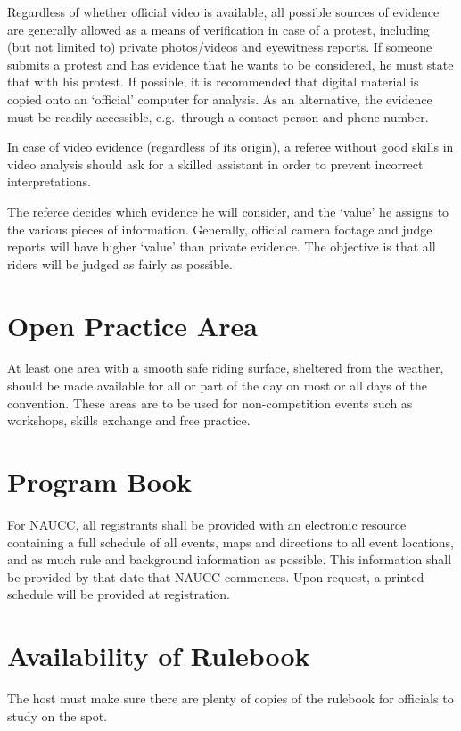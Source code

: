 Regardless of whether official video is available, all possible sources of evidence are generally allowed as a means of verification in case of a protest, including (but not limited to) private photos/videos and eyewitness reports.
If someone submits a protest and has evidence that he wants to be considered, he must state that with his protest.
If possible, it is recommended that digital material is copied onto an `official' computer for analysis.
As an alternative, the evidence must be readily accessible, e.g.\ through a contact person and phone number.

In case of video evidence (regardless of its origin), a referee without good skills in video analysis should ask for a skilled assistant in order to prevent incorrect interpretations.

The referee decides which evidence he will consider, and the `value' he assigns to the various pieces of information.
Generally, official camera footage and judge reports will have higher `value' than private evidence.
The objective is that all riders will be judged as fairly as possible.

\section{Open Practice Area}
At least one area with a smooth safe riding surface, sheltered from the weather, should be made available for all or part of the day on most or all days of the convention.
These areas are to be used for non-competition events such as workshops, skills exchange and free practice.

\section{Program Book}

For NAUCC, all registrants shall be provided with an electronic resource containing a full schedule of all events, maps and directions to all event locations, and as much rule and background information as possible.
This information shall be provided by that date that NAUCC commences.
Upon request, a printed schedule will be provided at registration.

\section{Availability of Rulebook}
The host must make sure there are plenty of copies of the rulebook for officials to study on the spot.

